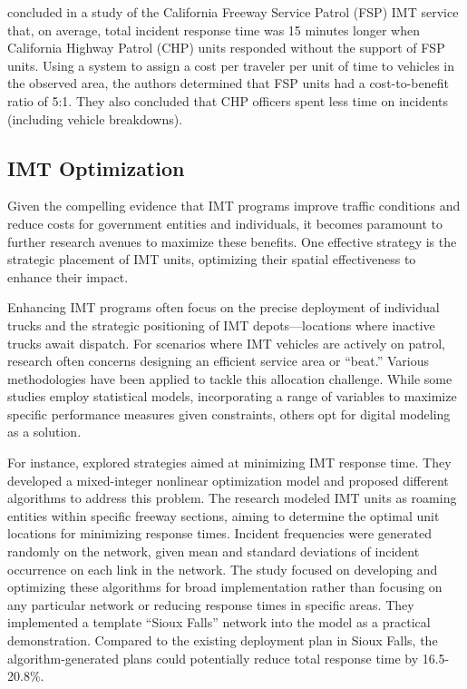 \documentclass[
  letterpaper,
  authoryear]{elsarticle}
\begin{document}
\citet{skabardonis1998} concluded in a study of the California Freeway
Service Patrol (FSP) IMT service that, on average, total incident
response time was 15 minutes longer when California Highway Patrol (CHP)
units responded without the support of FSP units. Using a system to
assign a cost per traveler per unit of time to vehicles in the observed
area, the authors determined that FSP units had a cost-to-benefit ratio
of 5:1. They also concluded that CHP officers spent less time on
incidents (including vehicle breakdowns).~

\hypertarget{imt-optimization}{%
\subsection{IMT Optimization}\label{imt-optimization}}

Given the compelling evidence that IMT programs improve traffic
conditions and reduce costs for government entities and individuals, it
becomes paramount to further research avenues to maximize these
benefits. One effective strategy is the strategic placement of IMT
units, optimizing their spatial effectiveness to enhance their impact.

Enhancing IMT programs often focus on the precise deployment of
individual trucks and the strategic positioning of IMT
depots---locations where inactive trucks await dispatch. For scenarios
where IMT vehicles are actively on patrol, research often concerns
designing an efficient service area or ``beat.'' Various methodologies
have been applied to tackle this allocation challenge. While some
studies employ statistical models, incorporating a range of variables to
maximize specific performance measures given constraints, others opt for
digital modeling as a solution.

For instance, \citet{lou2011} explored strategies aimed at minimizing
IMT response time. They developed a mixed-integer nonlinear optimization
model and proposed different algorithms to address this problem. The
research modeled IMT units as roaming entities within specific freeway
sections, aiming to determine the optimal unit locations for minimizing
response times. Incident frequencies were generated randomly on the
network, given mean and standard deviations of incident occurrence on
each link in the network. The study focused on developing and optimizing
these algorithms for broad implementation rather than focusing on any
particular network or reducing response times in specific areas. They
implemented a template ``Sioux Falls'' network into the model as a
practical demonstration. Compared to the existing deployment plan in
Sioux Falls, the algorithm-generated plans could potentially reduce
total response time by 16.5-20.8\%.
\end{document}

